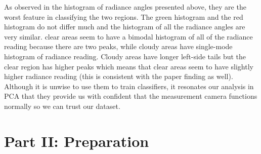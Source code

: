 \documentclass[jou]{apa}%
\begin{document}
As observed in the histogram of radiance angles presented above, they are the worst feature in classifying the two regions. The green histogram and the red histogram do not differ much and the histogram of all the radiance angles are very similar. 
clear areas seem to have a bimodal histogram of all of the radiance reading because there are two peaks, while cloudy areas have single-mode histogram of radiance reading. Cloudy areas have longer left-side tails but the clear region has higher peaks which means that clear areas seem to have slightly higher radiance reading (this is consistent with the paper finding as well).\\
\indent Although it is unwise to use them to train classifiers, it resonates our analysis in PCA that they provide us with confident that the measurement camera functions normally so we can trust our dataset.

\section{\textbf{Part II: Preparation}}
\end{document}
